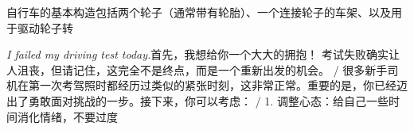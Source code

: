 \begin{multicols}{2}
自\allowbreak{}行\allowbreak{}车\allowbreak{}的\allowbreak{}基\allowbreak{}本\allowbreak{}构\allowbreak{}造\allowbreak{}包\allowbreak{}括\allowbreak{}\allowbreak{}两\allowbreak{}个\allowbreak{}轮\allowbreak{}子\allowbreak{}（\allowbreak{}通\allowbreak{}常\allowbreak{}带\allowbreak{}有\allowbreak{}轮\allowbreak{}\allowbreak{}胎\allowbreak{}）\allowbreak{}、\allowbreak{}一\allowbreak{}个\allowbreak{}连\allowbreak{}接\allowbreak{}轮\allowbreak{}子\allowbreak{}的\allowbreak{}\allowbreak{}车\allowbreak{}架\allowbreak{}、\allowbreak{}以\allowbreak{}及\allowbreak{}用\allowbreak{}于\allowbreak{}驱\allowbreak{}动\allowbreak{}轮\allowbreak{}\allowbreak{}子\allowbreak{}转\allowbreak{}\par\noindent\textit{I failed my driving test today.}\enspace 首\allowbreak{}先\allowbreak{}，\allowbreak{}我\allowbreak{}想\allowbreak{}给\allowbreak{}你\allowbreak{}一\allowbreak{}个\allowbreak{}大\allowbreak{}大\allowbreak{}的\allowbreak{}拥\allowbreak{}抱\allowbreak{}！\allowbreak{} 考\allowbreak{}试\allowbreak{}失\allowbreak{}败\allowbreak{}确\allowbreak{}实\allowbreak{}让\allowbreak{}人\allowbreak{}沮\allowbreak{}丧\allowbreak{}\allowbreak{}，\allowbreak{}但\allowbreak{}请\allowbreak{}记\allowbreak{}住\allowbreak{}，\allowbreak{}这\allowbreak{}完\allowbreak{}全\allowbreak{}不\allowbreak{}\allowbreak{}是\allowbreak{}终\allowbreak{}点\allowbreak{}，\allowbreak{}而\allowbreak{}是\allowbreak{}一\allowbreak{}个\allowbreak{}重\allowbreak{}新\allowbreak{}\allowbreak{}出\allowbreak{}发\allowbreak{}的\allowbreak{}机\allowbreak{}会\allowbreak{}。\allowbreak{} / 很\allowbreak{}多\allowbreak{}新\allowbreak{}手\allowbreak{}司\allowbreak{}机\allowbreak{}在\allowbreak{}第\allowbreak{}一\allowbreak{}次\allowbreak{}\allowbreak{}考\allowbreak{}驾\allowbreak{}照\allowbreak{}时\allowbreak{}都\allowbreak{}经\allowbreak{}历\allowbreak{}过\allowbreak{}类\allowbreak{}似\allowbreak{}\allowbreak{}的\allowbreak{}紧\allowbreak{}张\allowbreak{}时\allowbreak{}刻\allowbreak{}，\allowbreak{}这\allowbreak{}非\allowbreak{}常\allowbreak{}正\allowbreak{}\allowbreak{}常\allowbreak{}。\allowbreak{}重\allowbreak{}要\allowbreak{}的\allowbreak{}是\allowbreak{}，\allowbreak{}你\allowbreak{}已\allowbreak{}经\allowbreak{}\allowbreak{}迈\allowbreak{}出\allowbreak{}了\allowbreak{}勇\allowbreak{}敢\allowbreak{}面\allowbreak{}对\allowbreak{}挑\allowbreak{}战\allowbreak{}的\allowbreak{}\allowbreak{}一\allowbreak{}步\allowbreak{}。\allowbreak{}接\allowbreak{}下\allowbreak{}来\allowbreak{}，\allowbreak{}你\allowbreak{}可\allowbreak{}以\allowbreak{}\allowbreak{}考\allowbreak{}虑\allowbreak{}：\allowbreak{} / 1. 调\allowbreak{}整\allowbreak{}心\allowbreak{}态\allowbreak{}：\allowbreak{}给\allowbreak{}自\allowbreak{}己\allowbreak{}一\allowbreak{}些\allowbreak{}时\allowbreak{}间\allowbreak{}消\allowbreak{}化\allowbreak{}情\allowbreak{}绪\allowbreak{}，\allowbreak{}不\allowbreak{}要\allowbreak{}过\allowbreak{}度\allowbreak{}\par\medskip

\end{multicols}
